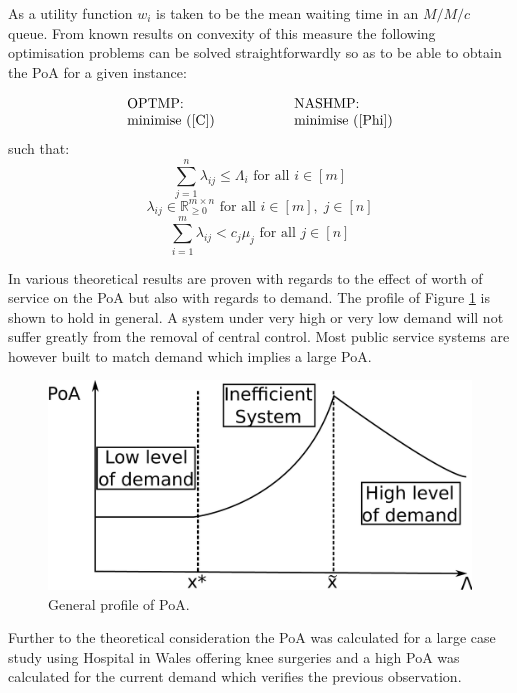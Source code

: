 \documentclass[a4paper,11pt]{article}
\begin{document}
As a utility function $w_i$ is taken to be the mean waiting time in an $M/M/c$ queue.
From known results on convexity of this measure \cite{} the following optimisation problems can be solved straightforwardly so as to be able to obtain the PoA for a given instance:

$$\begin{array}{l@{\hspace{2cm}}l}\text{OPTMP:}&\text{NASHMP:}\\
\text{minimise }(\ref{C})&\text{minimise }(\ref{Phi})
\end{array}$$
such that:
\begin{equation}
\sum_{j=1}^n\lambda_{ij}\leq\Lambda_{i}\text{ for all }i\in[m]\label{constraint 1}
\end{equation}
\begin{equation}
\lambda_{ij}\in\mathbb{R}^{m\times n}_{\geq 0}\text{ for all }i\in[m],\;j\in[n]\label{constraint 2}
\end{equation}
\begin{equation}
\sum_{i=1}^m\lambda_{ij}<c_j\mu_j\text{ for all }j\in[n]\label{constraint 3}
\end{equation}

In \cite{Knight2013} various theoretical results are proven with regards to the effect of worth of service on the PoA but also with regards to demand.
The profile of Figure \ref{fig:poaprofile} is shown to hold in general.
A system under very high or very low demand will not suffer greatly from the removal of central control.
Most public service systems are however built to match demand which implies a large PoA.

\begin{figure}[!hbtp]
\begin{center}
\includegraphics[width=.7\textwidth]{./Images/PoAPlotForSimpleDiagram.pdf}
\end{center}
\caption{General profile of PoA.}\label{fig:poaprofile}
\end{figure}

Further to the theoretical consideration the PoA was calculated for a large case study using Hospital in Wales offering knee surgeries and a high PoA was calculated for the current demand which verifies the previous observation.
\end{document}
